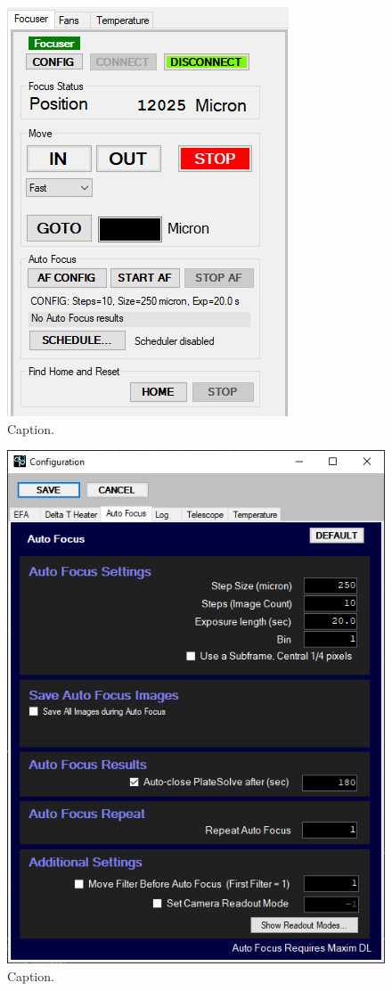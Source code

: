 \documentclass{article}
\begin{document}
	\begin{figure}[htbp!]
		\centering
		\includegraphics[scale=0.75]{images/pwi3-2.png}
		\caption{Caption.}
		\label{fig:pwi3-2}
	\end{figure}
	
	\begin{figure}[htbp!]
		\centering
		\includegraphics[scale=0.75]{images/pwi3-3.png}
		\caption{Caption.}
		\label{fig:pwi3-4}
	\end{figure}
\end{document}
